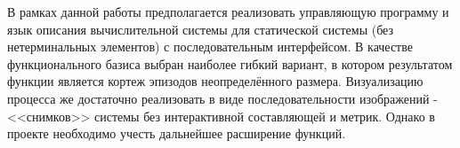В рамках данной работы предполагается реализовать управляющую программу и язык описания вычислительной системы для статической системы (без нетерминальных элементов) с последовательным интерфейсом.
В качестве функционального базиса выбран наиболее гибкий вариант, в котором результатом функции является кортеж эпизодов неопределённого размера.
Визуализацию процесса же достаточно реализовать в виде последовательности изображений - <<снимков>> системы без интерактивной составляющей и метрик. 
Однако в проекте необходимо учесть дальнейшее расширение функций.